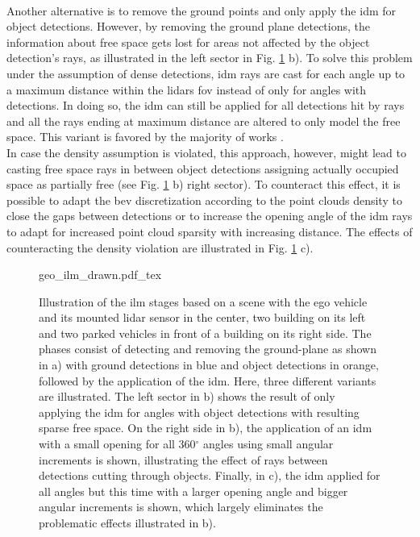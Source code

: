 \\
Another alternative is to remove the ground points and only apply the \gls{idm} for object detections. However, by removing the ground plane detections, the information about free space gets lost for areas not affected by the object detection's rays, as illustrated in the left sector in Fig. \ref{fig:geo_ilm_drawn} b). To solve this problem under the assumption of dense detections, \gls{idm} rays are cast for each angle up to a maximum distance within the lidars \gls{fov} instead of only for angles with detections. In doing so, the \gls{idm} can still be applied for all detections hit by rays and all the rays ending at maximum distance are altered to only model the free space. This variant is favored by the majority of works \cite{thrun2006stanley,narksri2018slope,fischler1981random,hough1962method,oliveira2016scene,tian2020fast}.
\\
In case the density assumption is violated, this approach, however, might lead to casting free space rays in between object detections assigning actually occupied space as partially free (see Fig. \ref{fig:geo_ilm_drawn} b) right sector). To counteract this effect, it is possible to adapt the \gls{bev} discretization according to the point clouds density to close the gaps between detections or to increase the opening angle of the \gls{idm} rays to adapt for increased point cloud sparsity with increasing distance. The effects of counteracting the density violation are illustrated in Fig. \ref{fig:geo_ilm_drawn} c).  
\begin{figure}
	\begin{center}
		{geo_ilm_drawn.pdf_tex}
		\caption{\label{fig:geo_ilm_drawn}Illustration of the \gls{ilm} stages based on a scene with the ego vehicle and its mounted lidar sensor in the center, two building on its left and two parked vehicles in front of a building on its right side. The phases consist of detecting and removing the ground-plane as shown in a) with ground detections in blue and object detections in orange, followed by the application of the \gls{idm}. Here, three different variants are illustrated. The left sector in b) shows the result of only applying the \gls{idm} for angles with object detections with resulting sparse free space. On the right side in b), the application of an \gls{idm} with a small opening for all 360$^\circ$ angles using small angular increments is shown, illustrating the effect of rays between detections cutting through objects. Finally, in c), the \gls{idm} applied for all angles but this time with a larger opening angle and bigger angular increments is shown, which largely eliminates the problematic effects illustrated in b).}
	\end{center}
\end{figure} 
%
